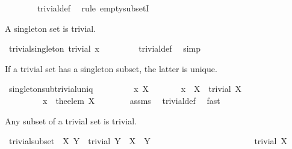 \begin{isabellebody}
%
\isadelimproof
\ \ \ \ \ \ %
\endisadelimproof
%
\isatagproof
{}\isamarkupfalse%
\ trivial{\isacharunderscore}def\ \isamarkupfalse%
\ {\isacharparenleft}rule\ empty{\isacharunderscore}subsetI{\isacharparenright}%
\endisatagproof
{\isafoldproof}%
%
\isadelimproof
%
\endisadelimproof
%
\begin{isamarkuptext}%
A singleton set is trivial.%
\end{isamarkuptext}%
\isamarkuptrue%
\isamarkupfalse%
\ trivial{\isacharunderscore}singleton{\isacharcolon}\ {\isachardoublequoteopen}trivial\ {\isacharbraceleft}x{\isacharbraceright}{\isachardoublequoteclose}\ \isanewline
%
\isadelimproof
\ \ \ \ \ \ %
\endisadelimproof
%
\isatagproof
{}\isamarkupfalse%
\ trivial{\isacharunderscore}def\ \isamarkupfalse%
\ simp%
\endisatagproof
{\isafoldproof}%
%
\isadelimproof
%
\endisadelimproof
%
\begin{isamarkuptext}%
If a trivial set has a singleton subset, the latter is unique.%
\end{isamarkuptext}%
\isamarkuptrue%
\isamarkupfalse%
\ singleton{\isacharunderscore}sub{\isacharunderscore}trivial{\isacharunderscore}uniq{\isacharcolon}\isanewline
\ \ \ \ \ \ \ \ \ x\ X\isanewline
\ \ \ \ \ \ \ {\isachardoublequoteopen}{\isacharbraceleft}x{\isacharbraceright}\ {\isasymsubseteq}\ X{\isachardoublequoteclose}\ \ {\isachardoublequoteopen}trivial\ X{\isachardoublequoteclose}\isanewline
\ \ \ \ \ \ \ \ \ {\isachardoublequoteopen}x\ {\isacharequal}\ the{\isacharunderscore}elem\ X{\isachardoublequoteclose}\isanewline
%
\isadelimproof
\isanewline
\ \ \ \ \ \ %
\endisadelimproof
%
\isatagproof
{}\isamarkupfalse%
\ assms\ \isamarkupfalse%
\ trivial{\isacharunderscore}def\ \isamarkupfalse%
\ fast%
\endisatagproof
{\isafoldproof}%
%
\isadelimproof
%
\endisadelimproof
%
\begin{isamarkuptext}%
Any subset of a trivial set is trivial.%
\end{isamarkuptext}%
\isamarkuptrue%
\isamarkupfalse%
\ trivial{\isacharunderscore}subset{\isacharcolon}\ \ X\ Y\ \ {\isachardoublequoteopen}trivial\ Y{\isachardoublequoteclose}\ \ {\isachardoublequoteopen}X\ {\isasymsubseteq}\ Y{\isachardoublequoteclose}\ \isanewline
\ \ \ \ \ \ \ \ \ \ \ \ \ \ \ \ \ \ \ \ \ \ \ {\isachardoublequoteopen}trivial\ X{\isachardoublequoteclose}\isanewline

\end{isabellebody}
